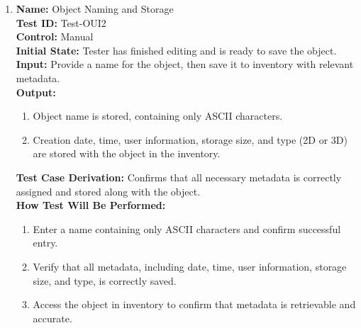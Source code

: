 \documentclass[12pt, titlepage]{article}
\begin{document}
\begin{enumerate}
  \item \textbf{Name:} Object Naming and Storage \label{itm:Test-OUI2} \\
        \textbf{Test ID:} Test-OUI2 \\
        \textbf{Control:} Manual \\
        \textbf{Initial State:} Tester has finished editing and is ready to save the object. \\
        \textbf{Input:} Provide a name for the object, then save it to inventory with relevant metadata. \\
        \textbf{Output:}
        \begin{enumerate}
          \item Object name is stored, containing only ASCII characters.
          \item Creation date, time, user information, storage size, and type (2D or 3D) are stored with the object in the inventory.
        \end{enumerate}
        \textbf{Test Case Derivation:} Confirms that all necessary metadata is correctly assigned and stored along with the object. \\
        \textbf{How Test Will Be Performed:}
        \begin{enumerate}
          \item Enter a name containing only ASCII characters and confirm successful entry.
          \item Verify that all metadata, including date, time, user information, storage size, and type, is correctly saved.
          \item Access the object in inventory to confirm that metadata is retrievable and accurate.
        \end{enumerate}


\end{enumerate}
\end{document}
